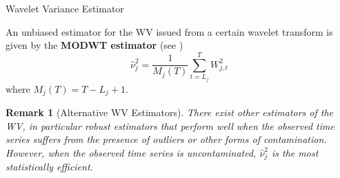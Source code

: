 \documentclass[envcountsect,usenames,dvipsnames]{beamer}
\theoremstyle{mystyle}
\newtheorem{Remark}{Remark}
\begin{document}




\begin{frame}{Wavelet Variance Estimator}
    \begin{Definition}
	An unbiased estimator for the WV issued from a certain wavelet transform is given by the \textbf{MODWT estimator} (see \cite{percival1995estimation})
	\begin{equation*}
	\hat{\nu}_{j}^2 = \frac{1}{M_j(T)} \sum_{t=L_j}^{T} {W}_{j,t}^2
	 \end{equation*}
	where $M_j(T) = T - L_j + 1$.	
    \end{Definition}
    
    \begin{Remark}[Alternative WV Estimators]
    There exist other estimators of the WV, in particular robust estimators that perform well when the observed time series suffers from the presence of outliers or other forms of contamination. However, when the observed time series is uncontaminated, $\hat{\nu}_{j}^2$ is the most statistically efficient.
    \end{Remark}
\end{frame}
\end{document}
